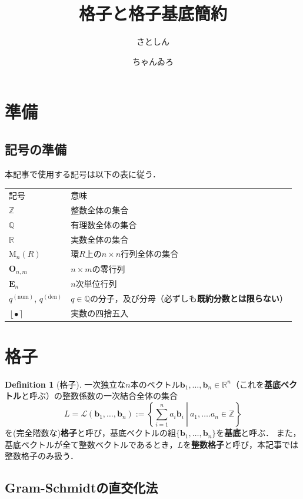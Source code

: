 \documentclass[a4j, dvipdfmx]{jsarticle}
\title{格子と格子基底簡約}
\author{さとしん \and ちゃんゐろ}
\theoremstyle{definition}
\newtheorem{definition}{Definition}[section]
\newcommand{\round}[1]{\left\lfloor #1\right\rceil}
\newcommand{\bhline}{\noalign{\hrule height 1.0pt}}
\begin{document}
\section{準備}

\subsection{記号の準備}

本記事で使用する記号は以下の表に従う．

\begin{tabular}{l||l}
    記号 & 意味\\
    \bhline
    $\mathbb{Z}$ & 整数全体の集合\\
    \hline
    $\mathbb{Q}$ & 有理数全体の集合\\
    \hline
    $\mathbb{R}$ & 実数全体の集合\\
    \hline
    $\mathrm{M}_n(R)$ & 環$R$上の$n\times n$行列全体の集合\\
    \hline
    $\boldsymbol{O}_{n, m}$ & $n\times m$の零行列\\
    \hline
    $\boldsymbol{E}_n$ & $n$次単位行列\\
    \hline
    $q^{(\text{num})}$, $q^{(\text{den})}$ & $q\in\mathbb{Q}$の分子，及び分母（必ずしも\textbf{既約分数とは限らない}）\\
    \hline
    $\round{\bullet}$ & 実数の四捨五入
\end{tabular}

\section{格子}

\begin{definition}[格子]
一次独立な$n$本のベクトル$\boldsymbol{b}_1,\ldots,\boldsymbol{b}_n\in\mathbb{R}^n$（これを\textbf{基底ベクトル}と呼ぶ）の整数係数の一次結合全体の集合
\[
L=\mathcal{L}(\boldsymbol{b}_1,\ldots,\boldsymbol{b}_n):=\left\lbrace \left.\sum_{i=1}^na_i\boldsymbol{b}_i~\right|~a_1,\ldots.a_n\in\mathbb{Z}\right\rbrace
\]
を(完全階数な)\textbf{格子}と呼び，基底ベクトルの組$\{\boldsymbol{b}_1,\ldots,\boldsymbol{b}_n\}$を\textbf{基底}と呼ぶ．
また，基底ベクトルが全て整数ベクトルであるとき，$L$を\textbf{整数格子}と呼び，本記事では整数格子のみ扱う．
\end{definition}

\subsection{Gram-Schmidtの直交化法}
\end{document}
